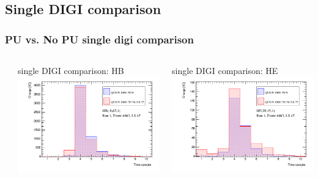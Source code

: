 \documentclass[bigger]{beamer}
\begin{document}
\subsection{Single DIGI comparison}
\label{sec-3-1}
\begin{frame}
\frametitle{PU vs. No PU single digi comparison}
\label{sec-3-1-1}
\begin{columns} %
\label{sec-3-1-1-1}
\begin{column}{0.55\textwidth}
\label{sec-3-1-1-1-1}

\centering
single DIGI comparison: HB
\includegraphics[width=\textwidth]{fig_old/pulse_QCD1800MC_PU_vs_NoPU.png}
\end{column}
\begin{column}{0.55\textwidth}
\label{sec-3-1-1-1-2}

\centering
single DIGI comparison: HE
\includegraphics[width=\textwidth]{fig_old/pulse_QCD1800MC_PU_vs_NoPU_HE.png}
\end{column}
\end{columns}
\label{sec-3-1-1-2}
\begin{itemize}


\end{itemize}
\end{frame}
\end{document}
